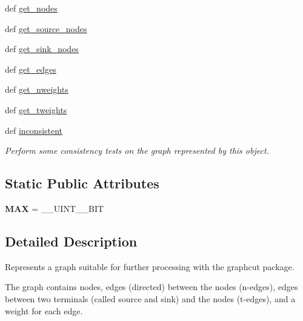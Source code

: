 \begin{DoxyCompactItemize}
\item 
def \hyperlink{classmedpy_1_1graphcut_1_1graph_1_1Graph_a1cf8f8077a620ae6fd90b327f689d5e5}{get\_\-nodes}
\item 
def \hyperlink{classmedpy_1_1graphcut_1_1graph_1_1Graph_a4c8dbbd92c6b0e5534869890810f0c78}{get\_\-source\_\-nodes}
\item 
def \hyperlink{classmedpy_1_1graphcut_1_1graph_1_1Graph_a988309a34486d834c65d87e83548b969}{get\_\-sink\_\-nodes}
\item 
def \hyperlink{classmedpy_1_1graphcut_1_1graph_1_1Graph_aabbf310726d5af9bbd79c6492f683c11}{get\_\-edges}
\item 
def \hyperlink{classmedpy_1_1graphcut_1_1graph_1_1Graph_a1090dadcdad71f1d629425c917e32ba5}{get\_\-nweights}
\item 
def \hyperlink{classmedpy_1_1graphcut_1_1graph_1_1Graph_a4b033a8067128c8a222f6c466f1b606f}{get\_\-tweights}
\item 
def \hyperlink{classmedpy_1_1graphcut_1_1graph_1_1Graph_a0fbe2b59f746e726f8bcf6c3111d7860}{inconsistent}
\begin{DoxyCompactList}\small\item\em Perform some consistency tests on the graph represented by this object. \end{DoxyCompactList}\end{DoxyCompactItemize}
\subsection*{Static Public Attributes}
\begin{DoxyCompactItemize}
\item 
\hypertarget{classmedpy_1_1graphcut_1_1graph_1_1Graph_aaed442199a4e04230982c1eb5cf809df}{
{\bfseries MAX} = \_\-\_\-UINT\_\_\-BIT}
\label{classmedpy_1_1graphcut_1_1graph_1_1Graph_aaed442199a4e04230982c1eb5cf809df}

\end{DoxyCompactItemize}


\subsection{Detailed Description}
Represents a graph suitable for further processing with the graphcut package. 

The graph contains nodes, edges (directed) between the nodes (n-\/edges), edges between two terminals (called source and sink) and the nodes (t-\/edges), and a weight for each edge.

